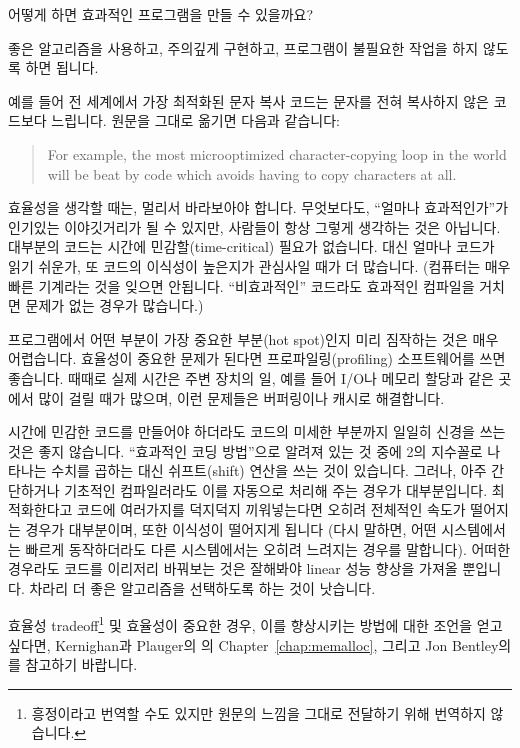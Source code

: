 \begin{faq}
	어떻게 하면 효과적인 프로그램을 만들 수 있을까요?


\A
	좋은 알고리즘을 사용하고, 주의깊게 구현하고, 프로그램이
	불필요한 작업을 하지 않도록 하면 됩니다.

	예를 들어 전 세계에서 가장 최적화된 문자 복사 코드는
	문자를 전혀 복사하지 않은 코드보다 느립니다. 원문을 그대로
	옮기면 다음과 같습니다:

\begin{quote}
	For example, the most microoptimized character-copying loop in the
	world will be beat by code which avoids having to copy
	characters at all.
\end{quote}

	효율성을 생각할 때는, 멀리서 바라보아야 합니다.  무엇보다도,
	``얼마나 효과적인가''가 인기있는 이야깃거리가 될 수 있지만,
	사람들이 항상 그렇게 생각하는 것은 아닙니다.
	대부분의 코드는 시간에 민감할(time-critical) 필요가 없습니다.
	대신 얼마나
	코드가 읽기 쉬운가, 또 코드의 이식성이 높은지가
	관심사일 때가 더 많습니다.  
	(컴퓨터는 매우 빠른 기계라는 것을 잊으면 안됩니다.  ``비효과적인''
	코드라도 효과적인 컴파일을 거치면 문제가 없는 경우가 많습니다.)

	프로그램에서 어떤 부분이 가장 중요한 부분(hot spot)인지 미리
	짐작하는 것은 매우 어렵습니다.  효율성이 중요한 문제가 된다면
	프로파일링(profiling) 소프트웨어를 쓰면 좋습니다.
	때때로 실제 시간은 주변 장치의 일, 예를 들어 I/O나 메모리 할당과
	같은 곳에서 많이 걸릴 때가 많으며, 이런 문제들은 버퍼링이나
	캐시로 해결합니다.

	시간에 민감한 코드를 만들어야 하더라도 코드의 미세한 부분까지
	일일히 신경을 쓰는 것은 좋지 않습니다.  ``효과적인 코딩 방법''으로
	알려져 있는 것 중에 2의 지수꼴로 나타나는 수치를 곱하는 대신
	쉬프트(shift) 연산을 쓰는 것이 있습니다.  그러나, 아주 간단하거나
	기초적인 컴파일러라도 이를 자동으로 처리해 주는 경우가 대부분입니다.
	최적화한다고 코드에 여러가지를 덕지덕지 끼워넣는다면 오히려 전체적인
	속도가 떨어지는 경우가 대부분이며, 또한 이식성이 떨어지게 됩니다
	(다시 말하면, 어떤 시스템에서는 빠르게 동작하더라도 다른 시스템에서는
	오히려 느려지는 경우를 말합니다).
	어떠한 경우라도 코드를 이리저리 바꿔보는 것은 잘해봐야 
	linear 성능 향상을 가져올 뿐입니다.  차라리 더 좋은 알고리즘을
	선택하도록 하는 것이 낫습니다.

	효율성 tradeoff\footnote{흥정이라고 번역할 수도 있지만 원문의
	느낌을 그대로 전달하기 위해 번역하지 않습니다.} 및 
	효율성이 중요한 경우, 이를 향상시키는 방법에 대한 조언을 얻고 싶다면,
	Kernighan과 Plauger의 의
	Chapter~\ref{chap:memalloc},
        그리고 Jon Bentley의 를
	참고하기 바랍니다.
\end{faq}

